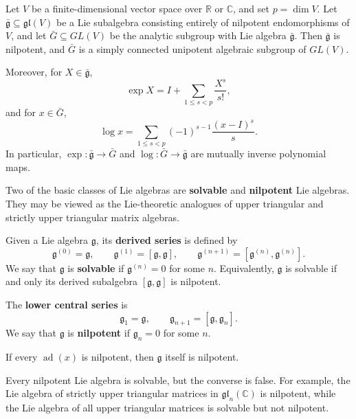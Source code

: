 \documentclass[12pt]{article}
\begin{document}
\begin{theorem}
    Let \(V\) be a finite-dimensional vector space over \(\mathbb R\) or
    \(\mathbb C\), and set \(p=\dim V\). Let $\bar{\mathfrak g}\subseteq \mathfrak{gl}(V)$
    be a Lie subalgebra consisting entirely of nilpotent endomorphisms of \(V\),
    and let \(\bar G\subseteq GL(V)\) be the analytic subgroup with Lie algebra
    \(\bar{\mathfrak g}\). Then \(\bar{\mathfrak g}\) is nilpotent, and
    \(\bar G\) is a simply connected unipotent algebraic subgroup of \(GL(V)\).

    Moreover, for \(X\in \bar{\mathfrak g}\),
    \[
        \exp X
        =
        I+\sum_{1\leq s<p}\frac{X^s}{s!},
    \]
    and for \(x\in \bar G\),
    \[
        \log x
        =
        \sum_{1\leq s<p}(-1)^{s-1}\frac{(x-I)^s}{s}.
    \]
    In particular, \(\exp:\bar{\mathfrak g}\to \bar G\) and
    \(\log:\bar G\to \bar{\mathfrak g}\) are mutually inverse polynomial maps.
\end{theorem}

Two of the basic classes of Lie algebras are \textbf{solvable} and \textbf{nilpotent} Lie algebras. They may be viewed as the Lie-theoretic analogues of upper triangular and strictly upper triangular matrix algebras.

Given a Lie algebra $\mathfrak g$, its \textbf{derived series} is defined by
\[
    \mathfrak g^{(0)}=\mathfrak g,\qquad
    \mathfrak g^{(1)}=[\mathfrak g,\mathfrak g],\qquad
    \mathfrak g^{(n+1)}=[\mathfrak g^{(n)},\mathfrak g^{(n)}].
\]
We say that $\mathfrak g$ is \textbf{solvable} if $\mathfrak g^{(n)}=0$ for some $n$. Equivalently, $\mathfrak g$ is solvable if and only its derived subalgebra $[\mathfrak g,\mathfrak g]$ is nilpotent.

The \textbf{lower central series} is
\[
    \mathfrak g_1=\mathfrak g,\qquad
    \mathfrak g_{n+1}=[\mathfrak g,\mathfrak g_n].
\]
We say that $\mathfrak g$ is \textbf{nilpotent} if $\mathfrak g_n=0$ for some $n$.

\begin{theorem}
     If every $\operatorname{ad}(x)$ is nilpotent, then $\mathfrak g$ itself is nilpotent.
\end{theorem}

Every nilpotent Lie algebra is solvable, but the converse is false. For example, the Lie algebra of strictly upper triangular matrices in $\mathfrak{gl}_n(\mathbb C)$ is nilpotent, while the Lie algebra of all upper triangular matrices is solvable but not nilpotent.
\end{document}
